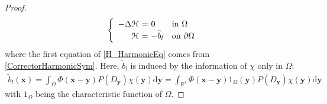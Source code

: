 \documentclass[reqno]{siamonline1116}
\numberwithin{theorem}{section}
\numberwithin{equation}{section}
\def\R{{\mathbb R}}
\def\rd{\mathrm{d}}
\def\Om{\Omega}
\def\p{\partial}
\def\x{\boldsymbol{x}}
\def\y{{\boldsymbol y}}
\def\mH{{\mathcal H}}
\def\wt{\widetilde}
\begin{document}
\begin{proof}
\begin{align}
\left\{\begin{array}{rcll}
-\Delta\mH\hspace{-0.65em}&=\hspace{-0.65em}&0&\text{in}~\Om \vspace{0.125em}\\
\mH\hspace{-0.65em}&=\hspace{-0.65em}&-\wt{b}_l&\text{on}~\p\Om
\end{array}\right.
\end{align}
where the first equation of \cref{H_HarmonicEq} comes from \cref{CorrectorHarmonicSym}. Here, $\wt{b}_l$ is induced by the information of $\chi$ only in $\Om$:
\begin{align}\label{TrueLocalField}
\wt{b}_l(\x)=\int_{\Om}\Phi(\x-\y)P(D_{\y})\chi(\y)\rd\y=\int_{\R^3}\Phi(\x-\y)1_{\Om}(\y)P(D_{\y})\chi(\y)\rd\y
\end{align}
with $1_{\Om}$ being the characteristic function of $\Om$.




\end{proof}
\end{document}

